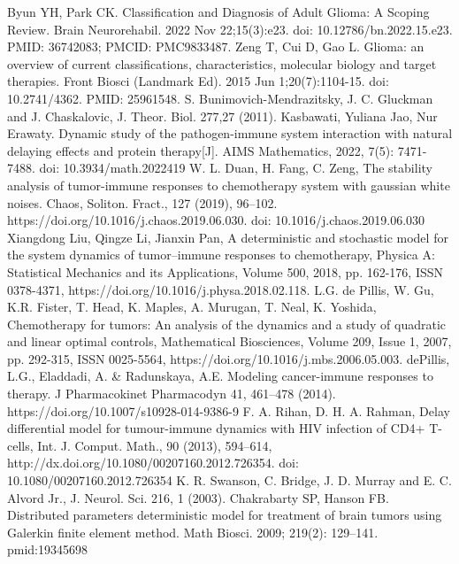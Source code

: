 \documentclass[12pt,a4paper]{extarticle}
\theoremstyle{definition}
\theoremstyle{definition}
\theoremstyle{definition}
\begin{document}
	\begin{thebibliography}{19}
		Byun YH, Park CK. Classification and Diagnosis of Adult Glioma: A Scoping Review. Brain Neurorehabil. 2022 Nov 22;15(3):e23. doi: 10.12786/bn.2022.15.e23. PMID: 36742083; PMCID: PMC9833487.
		Zeng T, Cui D, Gao L. Glioma: an overview of current classifications, characteristics, molecular biology and target therapies. Front Biosci (Landmark Ed). 2015 Jun 1;20(7):1104-15. doi: 10.2741/4362. PMID: 25961548.
		S. Bunimovich-Mendrazitsky, J. C. Gluckman and J. Chaskalovic, J. Theor. Biol. 277,27 (2011).
		Kasbawati, Yuliana Jao, Nur Erawaty. Dynamic study of the pathogen-immune system interaction with natural delaying effects and protein therapy[J]. AIMS Mathematics, 2022, 7(5): 7471-7488. doi: 10.3934/math.2022419
		W. L. Duan, H. Fang, C. Zeng, The stability analysis of tumor-immune responses to chemotherapy system with gaussian white noises. Chaos, Soliton. Fract., 127 (2019), 96–102. https://doi.org/10.1016/j.chaos.2019.06.030. doi: 10.1016/j.chaos.2019.06.030 
		Xiangdong Liu, Qingze Li, Jianxin Pan, A deterministic and stochastic model for the system dynamics of tumor–immune responses to chemotherapy, Physica A: Statistical Mechanics and its Applications, Volume 500, 2018, pp. 162-176, ISSN 0378-4371, https://doi.org/10.1016/j.physa.2018.02.118.
		L.G. de Pillis, W. Gu, K.R. Fister, T. Head, K. Maples, A. Murugan, T. Neal, K. Yoshida, Chemotherapy for tumors: An analysis of the dynamics and a study of quadratic and linear optimal controls, Mathematical Biosciences, Volume 209, Issue 1, 2007, pp. 292-315, ISSN 0025-5564, https://doi.org/10.1016/j.mbs.2006.05.003.
		dePillis, L.G., Eladdadi, A. \& Radunskaya, A.E. Modeling cancer-immune responses to therapy. J Pharmacokinet Pharmacodyn 41, 461–478 (2014). https://doi.org/10.1007/s10928-014-9386-9
		F. A. Rihan, D. H. A. Rahman, Delay differential model for tumour-immune dynamics with HIV infection of CD4+ T-cells, Int. J. Comput. Math., 90 (2013), 594–614, http://dx.doi.org/10.1080/00207160.2012.726354. doi: 10.1080/00207160.2012.726354 
		K. R. Swanson, C. Bridge, J. D. Murray and E. C. Alvord Jr., J. Neurol. Sci. 216, 1 (2003).
		Chakrabarty SP, Hanson FB. Distributed parameters deterministic model for treatment of brain tumors using Galerkin finite element method. Math Biosci. 2009; 219(2): 129–141. pmid:19345698

\end{thebibliography}
\end{document}
